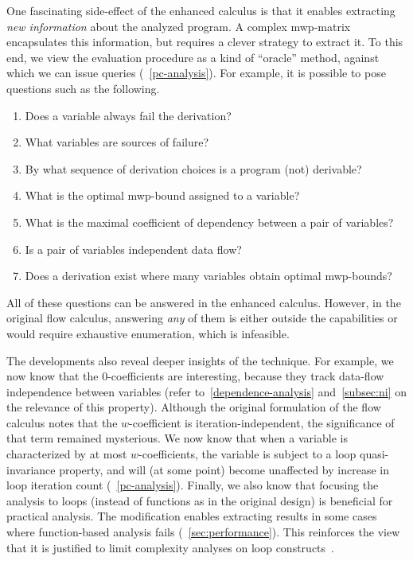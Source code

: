 One fascinating side-effect of the enhanced calculus is that it enables extracting \emph{new information} about the analyzed program.
A complex mwp-matrix encapsulates this information, but requires a clever strategy to extract it.
To this end, we view the evaluation procedure as a kind of \enquote{oracle} method, against which we can issue queries (\cf~\autoref{pc-analysis}).
For example, it is possible to pose questions such as the following.
\begin{enumerate}
\item Does a variable always fail the derivation?
\item What variables are sources of failure?
\item By what sequence of derivation choices is a program (not) derivable?
\item What is the optimal mwp-bound assigned to a variable?
\item What is the maximal coefficient of dependency between a pair of variables?
\item Is a pair of variables independent \wrt data flow?
\item Does a derivation exist where many variables obtain optimal mwp-bounds?
\end{enumerate}
All of these questions can be answered in the enhanced calculus.
However, in the original flow calculus, answering \emph{any} of them is either outside the capabilities or would require exhaustive enumeration, which is infeasible.

The developments also reveal deeper insights of the technique.
For example, we now know that the \(0\)-coefficients are interesting, because they track data-flow independence between variables
(refer to~\autoref{dependence-analysis} and~\autoref{subsec:ni} on the relevance of this property).
Although the original formulation of the flow calculus notes that the \(w\)-coefficient is iteration-independent, the significance of that term remained mysterious.
We now know that when a variable is characterized by at most \(w\)-coefficients, the variable is subject to a loop
quasi-invariance property, and will (at some point) become unaffected by increase in loop iteration count (\cf~\autoref{pc-analysis}).
Finally, we also know that focusing the analysis to loops (instead of functions as in the original design) is beneficial for practical analysis.
The modification enables extracting results in some cases where function-based analysis fails (\cf~\autoref{sec:performance}).
This reinforces the view that it is justified to limit complexity analyses on loop constructs~\cite{benamram2020}.

